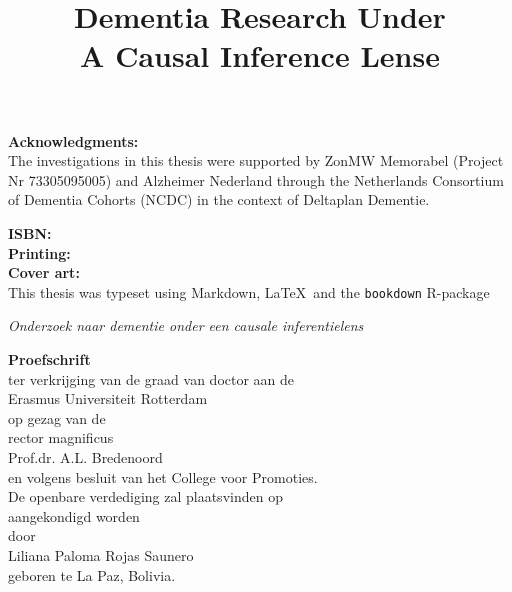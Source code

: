 \thispagestyle{empty}
\vspace*{\fill}
\small

\textbf{Acknowledgments:} \\
The investigations in this thesis were supported by
ZonMW Memorabel (Project Nr 73305095005) and 
Alzheimer Nederland through the Netherlands Consortium of Dementia Cohorts (NCDC) 
in the context of Deltaplan Dementie. 

\textbf{ISBN:} \\
\textbf{Printing:} \\  
\textbf{Cover art:} \\

This thesis was typeset using Markdown, \LaTeX\ and the \verb+bookdown+ R-package

\newpage
\thispagestyle{empty}
\begin{center}
\vspace{20mm}

\title{\textbf{\Large Dementia Research Under \\ \vspace{5mm} A Causal Inference Lense}}

\textit{\large Onderzoek naar dementie onder een causale inferentielens}

\vspace{10mm}
\textbf{\large{Proefschrift}}\\
\vspace{10mm}
ter verkrijging van de graad van doctor aan de\\
Erasmus Universiteit Rotterdam\\
op gezag van de\\
rector magnificus\\
\vspace{10mm}
Prof.dr. A.L. Bredenoord\\
\vspace{10mm}
en volgens besluit van het College voor Promoties.\\
De openbare verdediging zal plaatsvinden op\\
aangekondigd worden\\
\vspace{10mm}
door\\
\vspace{10mm}
Liliana Paloma Rojas Saunero\\
geboren te La Paz, Bolivia. 
\end{center}


